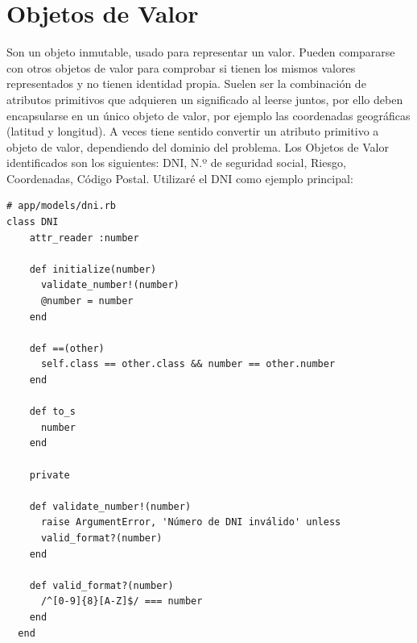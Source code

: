 \section*{Objetos de Valor}
Son un objeto inmutable, usado para representar un valor. Pueden compararse con otros objetos de valor para comprobar 
si tienen los mismos valores representados y no tienen identidad propia. 
Suelen ser la combinación de atributos primitivos que adquieren un significado al leerse juntos, por ello deben encapsularse
en un único objeto de valor, por ejemplo las coordenadas geográficas (latitud y longitud). A veces tiene sentido convertir
un atributo primitivo a objeto de valor, dependiendo del dominio del problema.
Los Objetos de Valor identificados son los siguientes: DNI, N.º de seguridad social, Riesgo, Coordenadas, Código Postal.
Utilizaré el DNI como ejemplo principal: 


\begin{lstlisting}
# app/models/dni.rb
class DNI
    attr_reader :number
  
    def initialize(number)
      validate_number!(number)
      @number = number
    end
  
    def ==(other)
      self.class == other.class && number == other.number
    end
  
    def to_s
      number
    end
  
    private
  
    def validate_number!(number)
      raise ArgumentError, 'Número de DNI inválido' unless 
      valid_format?(number)
    end
  
    def valid_format?(number)
      /^[0-9]{8}[A-Z]$/ === number
    end
  end
\end{lstlisting}

  

